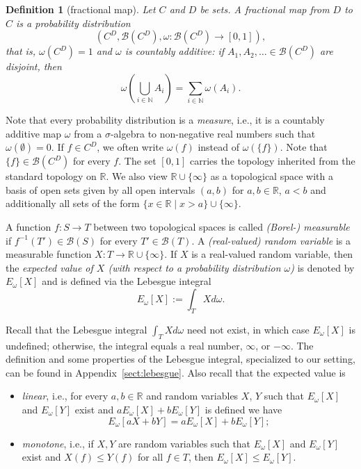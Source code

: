 \documentclass[nonacm]{acmart}
\newtheorem{definition}[theorem]{Definition}
\begin{document}
\begin{definition}[fractional map] \label{def:frac-map}
Let $C$ and $D$ be sets. A \emph{fractional map} from $D$ to $C$ is a probability distribution 
$$(C^D, \mathcal{B}(C^D),\omega \colon \mathcal{B}(C^D) \to [0,1]),$$
that is, $\omega(C^D) = 1$ and $\omega$ is countably additive: if $A_1,A_2,\dots \in \mathcal{B}(C^D)$ are disjoint, then $$\omega(\bigcup_{i \in {\mathbb N}} A_i) = \sum_{i \in {\mathbb N}} \omega(A_i).$$
\end{definition}
Note that every probability distribution is a \emph{measure}, i.e., it is a countably additive map $\omega$ from a $\sigma$-algebra to non-negative real numbers such that $\omega(\emptyset)=0$. If $f \in C^D$, we often write $\omega(f)$ instead of $\omega(\{f\})$. Note that $\{f\} \in \mathcal{B}(C^D)$ 
for every $f$. 
The set $[0,1]$ carries the topology inherited from  the standard topology on ${\mathbb R}$. We also view ${\mathbb R} \cup \{\infty\}$ as a topological space with a basis of open sets given by
all open intervals
$(a,b)$ for $a,b \in {\mathbb R}$, $a<b$ and additionally all sets of the form $\{x \in {\mathbb R} \mid x > a\} \cup \{\infty\}$.

A function $f \colon S \to T$ between two topological spaces is called \emph{(Borel-) measurable} if $f^{-1}(T') \in 
\mathcal{B}(S)$ for every $T' \in \mathcal{B}(T)$.
%
A \emph{(real-valued) random variable} is a measurable function $X \colon T \to {\mathbb R} \cup \{\infty\}$.
If $X$ is a real-valued random variable, then the \emph{expected value of $X$ (with respect to a probability distribution $\omega$)} is denoted by $E_\omega[X]$ and is defined 
via the Lebesgue integral 
$$ E_\omega[X] := \int_T X d \omega.$$

Recall that the Lebesgue integral $\int_T X d \omega$ need not exist, in which case $E_\omega[X]$ is undefined; otherwise, the integral equals a real number, $\infty$, or $-\infty$. 
The definition and some properties of the Lebesgue integral, specialized to our setting, 
can be found in Appendix~\ref{sect:lebesgue}.
Also recall that the expected value is 
\begin{itemize}
    \item \emph{linear}, i.e., for every $a,b \in \mathbb{R}$ and random variables $X$, $Y$ such that $E_\omega[X]$ and $E_\omega[Y]$ exist and $aE_\omega[X]+bE_\omega[Y]$ is defined we have $$E_\omega[aX+bY]=aE_\omega[X]+bE_\omega[Y];$$ 
\item \emph{monotone}, i.e., if $X,Y$ are random variables such that $E_\omega[X]$ and $E_\omega[Y]$ exist and $X(f) \leq Y(f)$ for all $f \in T$, then $E_\omega[X] \leq E_\omega[Y]$.
\end{itemize}
\end{document}
